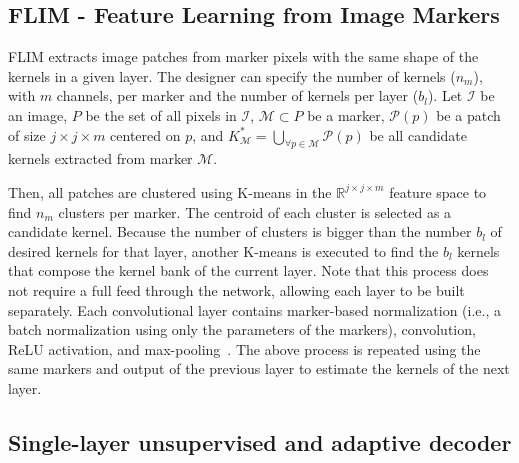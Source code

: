 \documentclass[times,twocolumn,final,authoryear]{elsarticle}
\begin{document}
\subsection{FLIM - Feature Learning from Image Markers}
    FLIM extracts image patches from marker pixels with the same shape of the kernels in a given layer. The designer can specify the number of kernels ($n_m$), with $m$ channels, per marker and the number of kernels per layer ($b_l$). Let $\mathcal{I}$ be an image, $\textit{P}$ be the set of all pixels in $\mathcal{I}$, $\mathcal{M} \subset \textit{P}$ be a marker, $\mathcal{P}(p)$ be a patch of size $j\times j\times m$ centered on $p$, and $K^*_\mathcal{M} = \bigcup\limits_{\forall p \in \mathcal{M}}{\mathcal{P}(p)}$ be all candidate kernels extracted from marker $\mathcal{M}$.
    
    Then, all patches are clustered using K-means in the $\mathbb{R}^{j\times j\times m}$ feature space to find $n_m$ clusters per marker. The centroid of each cluster is selected as a candidate kernel. Because the number of clusters is bigger than the number $b_l$ of desired kernels for that layer, another K-means is executed to find the $b_l$ kernels that compose the kernel bank of the current layer. Note that this process does not require a full feed through the network, allowing each layer to be built separately. Each convolutional layer contains marker-based normalization (i.e., a batch normalization using only the parameters of the markers), convolution, ReLU activation, and max-pooling~\cite{sousa2021cnn}. The above process is repeated using the same markers and output of the previous layer to estimate the kernels of the next layer.  
    
\subsection{Single-layer unsupervised and adaptive decoder}
\end{document}
